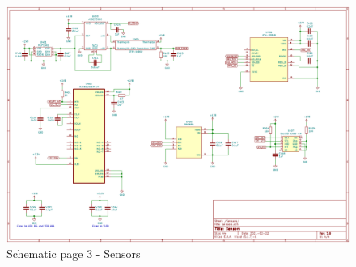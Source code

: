 \begin{landscape}
\begin{figure}[!htb]
\centering
\includegraphics[width=\paperwidth,keepaspectratio]{images/Schematic_REV3_Sensors.png}
\caption{Schematic page 3 - Sensors}
\label{fig:schematic_sensors}
\end{figure}

\end{landscape}
